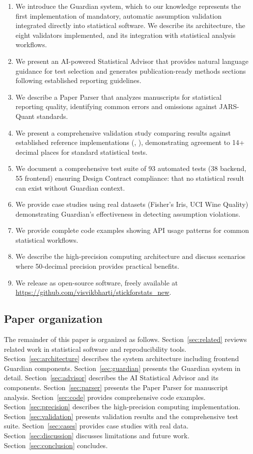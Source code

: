 \documentclass[article]{jss}
\begin{document}
\begin{enumerate}
\item We introduce the Guardian system, which to our knowledge represents the first implementation of mandatory, automatic assumption validation integrated directly into statistical software. We describe its architecture, the eight validators implemented, and its integration with statistical analysis workflows.
\item We present an AI-powered Statistical Advisor that provides natural language guidance for test selection and generates publication-ready methods sections following established reporting guidelines.
\item We describe a Paper Parser that analyzes manuscripts for statistical reporting quality, identifying common errors and omissions against JARS-Quant standards.
\item We present a comprehensive validation study comparing  results against established reference implementations (, ), demonstrating agreement to 14+ decimal places for standard statistical tests.
\item We document a comprehensive test suite of 93 automated tests (38 backend, 55 frontend) ensuring Design Contract compliance: that no statistical result can exist without Guardian context.
\item We provide case studies using real datasets (Fisher's Iris, UCI Wine Quality) demonstrating Guardian's effectiveness in detecting assumption violations.
\item We provide complete code examples showing API usage patterns for common statistical workflows.
\item We describe the high-precision computing architecture and discuss scenarios where 50-decimal precision provides practical benefits.
\item We release  as open-source software, freely available at \url{https://github.com/visvikbharti/stickforstats_new}.
\end{enumerate}

\subsection{Paper organization}

The remainder of this paper is organized as follows. Section~\ref{sec:related} reviews related work in statistical software and reproducibility tools. Section~\ref{sec:architecture} describes the system architecture including frontend Guardian components. Section~\ref{sec:guardian} presents the Guardian system in detail. Section~\ref{sec:advisor} describes the AI Statistical Advisor and its components. Section~\ref{sec:parser} presents the Paper Parser for manuscript analysis. Section~\ref{sec:code} provides comprehensive code examples. Section~\ref{sec:precision} describes the high-precision computing implementation. Section~\ref{sec:validation} presents validation results and the comprehensive test suite. Section~\ref{sec:cases} provides case studies with real data. Section~\ref{sec:discussion} discusses limitations and future work. Section~\ref{sec:conclusion} concludes.
\end{document}
